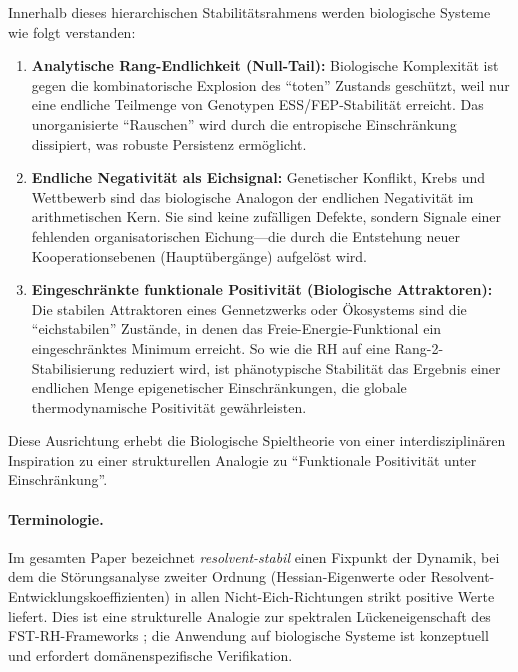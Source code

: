 \documentclass[12pt,a4paper]{article}
\theoremstyle{remark}
\begin{document}
Innerhalb dieses hierarchischen Stabilit\"atsrahmens werden biologische Systeme wie folgt verstanden:
\begin{enumerate}[label=\alph*)]
    \item \textbf{Analytische Rang-Endlichkeit (Null-Tail):} Biologische Komplexit\"at ist gegen die kombinatorische Explosion des ``toten'' Zustands gesch\"utzt, weil nur eine endliche Teilmenge von Genotypen ESS/FEP-Stabilit\"at erreicht. Das unorganisierte ``Rauschen'' wird durch die entropische Einschr\"ankung dissipiert, was robuste Persistenz erm\"oglicht.
    \item \textbf{Endliche Negativit\"at als Eichsignal:} Genetischer Konflikt, Krebs und Wettbewerb sind das biologische Analogon der endlichen Negativit\"at im arithmetischen Kern. Sie sind keine zuf\"alligen Defekte, sondern Signale einer fehlenden organisatorischen Eichung---die durch die Entstehung neuer Kooperationsebenen (Haupt\"uberg\"ange) aufgel\"ost wird.
    \item \textbf{Eingeschr\"ankte funktionale Positivit\"at (Biologische Attraktoren):} Die stabilen Attraktoren eines Gennetzwerks oder \"Okosystems sind die ``eichstabilen'' Zust\"ande, in denen das Freie-Energie-Funktional ein eingeschr\"anktes Minimum erreicht. So wie die RH auf eine Rang-2-Stabilisierung reduziert wird, ist ph\"anotypische Stabilit\"at das Ergebnis einer endlichen Menge epigenetischer Einschr\"ankungen, die globale thermodynamische Positivit\"at gew\"ahrleisten.
\end{enumerate}

Diese Ausrichtung erhebt die Biologische Spieltheorie von einer interdisziplin\"aren Inspiration zu einer strukturellen Analogie zu ``Funktionale Positivit\"at unter Einschr\"ankung''.

\paragraph{Terminologie.} Im gesamten Paper bezeichnet \emph{resolvent-stabil} einen Fixpunkt der Dynamik, bei dem die St\"orungsanalyse zweiter Ordnung (Hessian-Eigenwerte oder Resolvent-Entwicklungskoeffizienten) in allen Nicht-Eich-Richtungen strikt positive Werte liefert. Dies ist eine strukturelle Analogie zur spektralen L\"uckeneigenschaft des FST-RH-Frameworks \citep{FST-RH2}; die Anwendung auf biologische Systeme ist konzeptuell und erfordert dom\"anenspezifische Verifikation.

\end{document}
